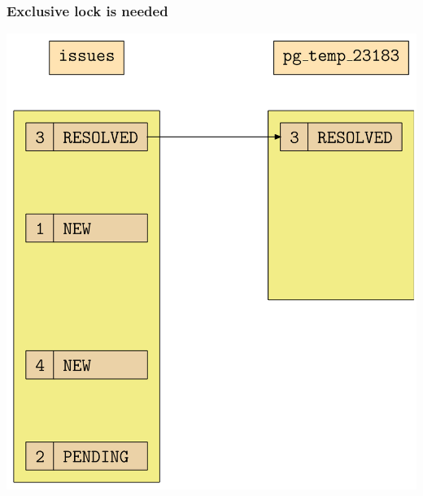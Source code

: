 \begin{frame}
  \frametitle{Exclusive lock is needed}
  \begin{center}
    \includegraphics[height=\sizeforimages\textheight]{images/exclusive_lock_needed_01.png}
  \end{center}
\end{frame}

